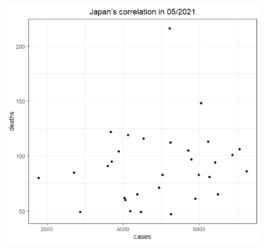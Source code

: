 \documentclass[a4paper]{article}
\theoremstyle{definition}
\begin{document}
\begin{enumerate}[1)]
\begin{figure}[H]
\begin{center}
        \includegraphics[scale = 0.3]{ix/ix.2/JPN_05_2021.png}
        

\end{center}
\end{figure}
\end{enumerate}
\end{document}
